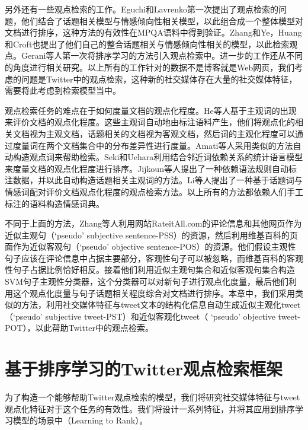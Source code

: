 另外还有一些观点检索的工作。Eguchi和Lavrenko第一次提出了观点检索的问题，他们结合了话题相关模型与情感倾向性相关模型，以此组合成一个整体模型对文档进行排序，这种方法的有效性在MPQA语料中得到验证。Zhang和Ye，Huang和Croft也提出了他们自己的整合话题相关与情感倾向性相关的模型，以此检索观点。Gerani等人第一次将排序学习的方法引入观点检索中。进一步的工作还从不同的角度进行相关研究。以上所有的工作针对的数据不是博客就是Web网页，我们考虑的问题是Twitter中的观点检索，这种新的社交媒体存在大量的社交媒体特征，需要将此考虑到检索模型当中。

观点检索任务的难点在于如何度量文档的观点化程度。He等人基于主观词的出现来评价文档的观点化程度。这些主观词自动地由标注语料产生，他们将观点化的相关文档视为主观文档，话题相关的文档视为客观文档，然后词的主观化程度可以通过度量词在两个文档集合中的分布差异性进行度量。Amati等人采用类似的方法自动构造观点词来帮助检索。Seki和Uehara利用结合邻近词依赖关系的统计语言模型来度量文档的观点化程度进行排序。Jijkoun等人提出了一种依赖语法规则自动标注数据，并以此自动构造话题相关主观词的方法。Li等人提出了一种基于话题词与情感词配对评价文档观点化程度的观点检索方法。以上所有的方法都依赖人们手工标注的语料构造情感词典。

不同于上面的方法，Zhang等人利用网站RateitAll.com的评论信息和其他网页作为近似主观句（`pseudo' subjective sentence-PSS）的资源，然后利用维基百科的页面作为近似客观句（`pseudo' objective sentence-POS）的资源。他们假设主观性句子应该在评论信息中占据主要部分，客观性句子可以被忽略，而维基百科的客观性句子占据比例恰好相反。接着他们利用近似主观句集合和近似客观句集合构造SVM句子主观性分类器，这个分类器可以对新句子进行观点化度量，最后他们利用这个观点化度量与句子话题相关程度综合对文档进行排序。本章中，我们采用类似的方法，利用社交媒体特征与tweet文本的结构化信息自动生成近似主观化tweet（`pseudo' subjective tweet-PST）和近似客观化tweet（ `pseudo' objective tweet-POT），以此帮助Twitter中的观点检索。

\section{基于排序学习的Twitter观点检索框架}
为了构造一个能够帮助Twitter观点检索的模型，我们将研究社交媒体特征与tweet观点化特征对于这个任务的有效性。我们将设计一系列特征，并将其应用到排序学习模型的场景中（Learning to Rank）。


